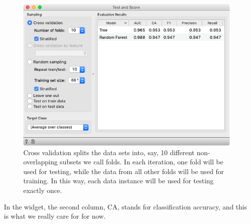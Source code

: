\begin{figure}[h]
    \centering
    \includegraphics[scale=0.4]{test_and_score.png}
    \caption{Cross validation splits the data sets into, say, 10 different non-overlapping subsets we call folds. In each iteration, one fold will be used for testing, while the data from all other folds will be used for training. In this way, each data instance will be used for testing exactly once.}
\end{figure}

In the  widget, the second column, CA, stands for classification accuracy, and this is what we really care for for now.